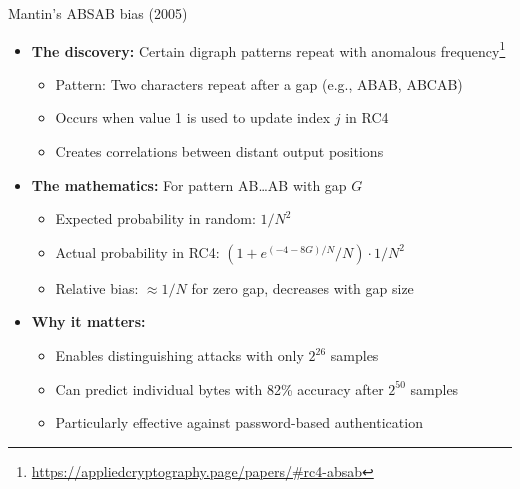 \documentclass[aspectratio=169, lualatex, handout]{beamer}
\begin{document}
\begin{frame}{Mantin's ABSAB bias (2005)}
	\begin{itemize}[<+->]
		\item \textbf{The discovery:} Certain digraph patterns repeat with anomalous frequency\footnote{\url{https://appliedcryptography.page/papers/\#rc4-absab}}
		      \begin{itemize}[<+->]
			      \item Pattern: Two characters repeat after a gap (e.g., ABAB, ABCAB)
			      \item Occurs when value 1 is used to update index $j$ in RC4
			      \item Creates correlations between distant output positions
		      \end{itemize}
		\item \textbf{The mathematics:} For pattern AB\ldots AB with gap $G$
		      \begin{itemize}[<+->]
			      \item Expected probability in random: $1/N^2$
			      \item Actual probability in RC4: $(1 + e^{(-4-8G)/N}/N) \cdot 1/N^2$
			      \item Relative bias: $\approx 1/N$ for zero gap, decreases with gap size
		      \end{itemize}
		\item \textbf{Why it matters:}
		      \begin{itemize}[<+->]
			      \item Enables distinguishing attacks with only $2^{26}$ samples
			      \item Can predict individual bytes with 82\% accuracy after $2^{50}$ samples
			      \item Particularly effective against password-based authentication
		      \end{itemize}
	\end{itemize}
\end{frame}
\end{document}
